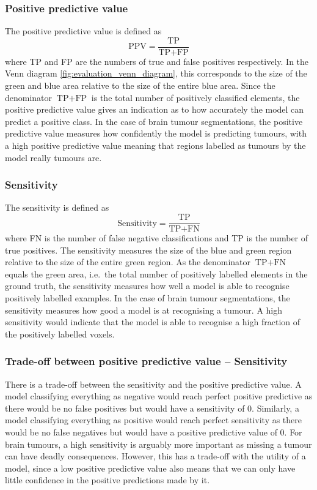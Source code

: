 \documentclass[12pt,a4paper,twoside,openright]{report}
\begin{document}
\subsubsection{Positive predictive value}
The positive predictive value is defined as
\begin{equation}
	\textrm{PPV} = \frac{\textrm{TP}}{\textrm{TP} + \textrm{FP}}
\end{equation}
where \textrm{TP} and \textrm{FP} are the numbers of true and false positives respectively. In the Venn diagram \ref{fig:evaluation_venn_diagram}, this corresponds to the size of the green and blue area relative to the size of the entire blue area.  Since the denominator $\textrm{TP} + \textrm{FP}$ is the total number of positively classified elements, the positive predictive value gives an indication as to how accurately the model can predict a positive class. In the case of brain tumour segmentations, the positive predictive value measures how confidently the model is predicting tumours, with a high positive predictive value meaning that regions labelled as tumours by the model really tumours are.
\subsubsection{Sensitivity}
The sensitivity is defined as 
\begin{equation}
	\textrm{Sensitivity} = \frac{\textrm{TP}}{\textrm{TP} + \textrm{FN}}
\end{equation}
where \textrm{FN} is the number of false negative classifications and \textrm{TP} is the number of true positives. The sensitivity measures the size of the blue and green region relative to the size of the entire green region. As the denominator $\textrm{TP} + \textrm{FN}$ equals the green area, i.e.\ the total number of positively labelled elements in the ground truth, the sensitivity measures how well a model is able to recognise positively labelled examples. In the case of brain tumour segmentations, the sensitivity measures how good a model is at recognising a tumour. A high sensitivity would indicate that the model is able to recognise a high fraction of the positively labelled voxels.

\subsubsection{Trade-off between positive predictive value -- Sensitivity }
There is a trade-off between the sensitivity and the positive predictive value. A model classifying everything as negative would reach perfect positive predictive as there would be no false positives but would have a sensitivity of 0. Similarly, a model classifying everything as positive would reach perfect sensitivity as there would be no false negatives but would have a positive predictive value of 0. For brain tumours, a high sensitivity is arguably more important as missing a tumour can have deadly consequences. However, this has a trade-off with the utility of a model, since a low positive predictive value also means that we can only have little confidence in the positive predictions made by it.
\end{document}
